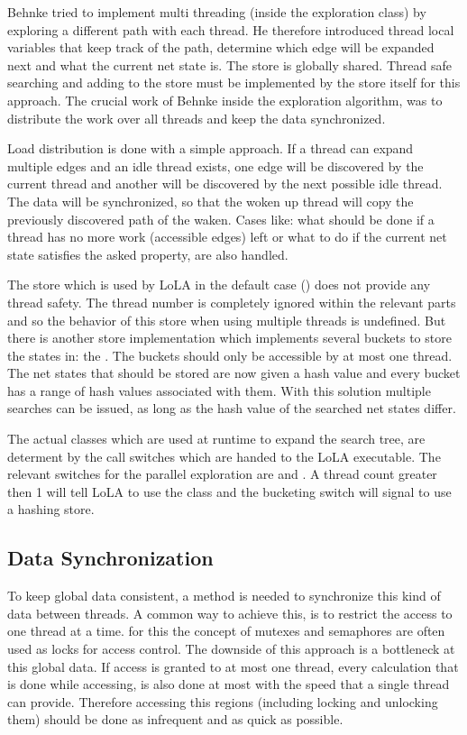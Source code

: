 Behnke tried to implement multi threading (inside the exploration class) by exploring a different path with each thread. He therefore introduced thread local variables that keep track of the path, determine which edge will be expanded next and what the current net state is. The store is globally shared. Thread safe searching and adding to the store must be implemented by the store itself for this approach. The crucial work of Behnke inside the exploration algorithm, was to distribute the work over all threads and keep the data synchronized.

Load distribution is done with a simple approach. If a thread can expand multiple edges and an idle thread exists, one edge will be discovered by the current thread and another will be discovered by the next possible idle thread. The data will be synchronized, so that the woken up thread will copy the previously discovered path of the waken. Cases like: what should be done if a thread has no more work (accessible edges) left or what to do if the current net state satisfies the asked property, are also handled.

The store which is used by LoLA in the default case () does not provide any thread safety. The thread number is completely ignored within the relevant parts and so the behavior of this store when using multiple threads is undefined. But there is another store implementation which implements several buckets to store the states in: the . The buckets should only be accessible by at most one thread. The net states that should be stored are now given a hash value and every bucket has a range of hash values associated with them. With this solution multiple searches can be issued, as long as the hash value of the searched net states differ.

The actual classes which are used at runtime to expand the search tree, are determent by the call switches which are handed to the LoLA executable. The relevant switches for the parallel exploration are  and . A thread count greater then 1 will tell LoLA to use the  class and the bucketing switch will signal to use a hashing store.

\subsection{Data Synchronization}
To keep global data consistent, a method is needed to synchronize this kind of data between threads. A common way to achieve this, is to restrict the access to one thread at a time. for this the concept of mutexes and semaphores are often used as locks for access control. The downside of this approach is a bottleneck at this global data. If access is granted to at most one thread, every calculation that is done while accessing, is also done at most with the speed that a single thread can provide. Therefore accessing this regions (including locking and unlocking them) should be done as infrequent and as quick as possible.

